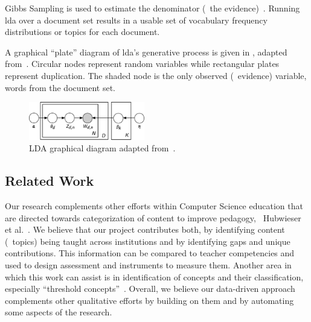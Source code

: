 
\noindent
Gibbs Sampling is used to estimate the denominator (\ie\ the evidence)~\cite{Blei2003}.
Running \ac{lda} over a document set results in a usable set of vocabulary frequency distributions or topics for each document.


A graphical ``plate'' diagram of \ac{lda}'s generative process is given in , adapted from~\cite{Blei2003}.
Circular nodes represent random variables while rectangular plates represent duplication.
The shaded node is the only observed (\ie\ evidence) variable, words from the document set.


\begin{figure}
  \centering
  \includegraphics[width=0.45\textwidth]{figures/lda-plates}
  \caption{LDA graphical diagram adapted from~\cite{Blei2012}\label{fig:lda-plates}.}
\end{figure}


\subsection{Related Work}
\label{sec:related-work}


Our research complements other efforts within Computer Science education that are directed towards categorization of content to improve pedagogy, \eg\ Hubwieser et al.~\cite{hubwieser2013}.
We believe that our project contributes both, by identifying content (\ie\ topics) being taught across institutions and by identifying gaps and unique contributions.
This information can be compared to teacher competencies and used to design assessment and instruments to measure them.
Another area in which this work can assist is in identification of concepts and their classification, especially ``threshold concepts''~\cite{ShinnersKennedyFincher2013}.
Overall, we believe our data-driven approach complements other qualitative efforts by building on them and by automating some aspects of the research.

